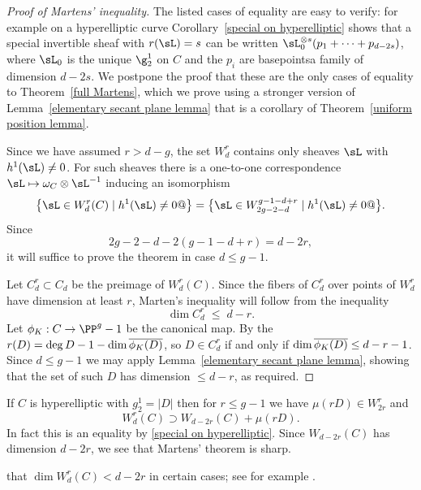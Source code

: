 \begin{proof}[Proof of Martens' inequality] 
 The listed cases of equality are easy to verify: for example on a hyperelliptic curve Corollary~\ref{special on hyperelliptic} shows that a special invertible sheaf with  $r(\sL) = s$ can be written $\sL_0^{\otimes s}(p_1+\cdots + p_{d-2s})$, where
$\sL_0$ is the unique $\g^1_2$ on $C$ and the $p_i$ are basepoints\emdash a family of dimension $d-2s$.
We postpone the proof that these are the only cases of equality to Theorem~\ref{full Martens}, which we prove
using a stronger version of Lemma~\ref{elementary secant plane lemma} that is a corollary of Theorem~\ref{uniform position lemma}. 

Since we have assumed $r>d-g$, the set $W^r_d$ contains only  sheaves
 $\sL$ with $h^1(\sL)\neq 0$. For such sheaves there is a one-to-one 
correspondence $\sL \mapsto \omega_C\otimes \sL^{-1}$ inducing an isomorphism
$$
\bigl\{\sL \in W^r_d(C) \mid h^1(\sL) \neq 0 @\bigr\}= \bigl\{\sL \in W^{g-1-d+r}_{2g-2-d} \mid h^1(\sL) \neq 0 @\bigl\}
.
$$
Since
$$
2g-2-d - 2(g-1-d+r) = d-2r,
$$
it will suffice to prove the theorem in case $d \leq g-1$.

\def\overlow#1{\overline{\vbox to 6.8pt{}\smash{#1}}}

Let $C^r_d\subset C_d$ be the preimage of $W^r_d(C)$. Since the fibers of $C^r_d$ over points of
$W^r_d$ have dimension at least $r$, Marten's inequality will follow from the inequality
$$
\dim C^r_d \; \leq \; d-r.
$$
\meshing
Let $\phi_K: C\to \PP^g-1$ be the canonical map. By the 
%
%
$r(D) = \deg D -1 -\dim\overlow{\phi_K(D)}$, 
so $D\in C^r_d$ if and only if
$\dim \overlow{\phi_K(D)}\leq d-r-1$. Since $d\leq g-1$ we may apply  Lemma~\ref{elementary secant plane lemma}, showing that the set of such $D$ has dimension $\leq d-r$, as required.
\end{proof}


If $C$ is hyperelliptic with $g^1_2 = |D|$ then for $r\leq g-1$ we have $\mu(rD) \in W^r_{2r}$ and
$$
W^r_d(C) \supset W_{d-2r}(C) + \mu(rD).
$$
In fact this is an equality by
\ref{special on hyperelliptic}. 
Since $W_{d-2r}(C)$ has dimension $d-2r$, we see that Martens' theorem is sharp. 

%
that $\dim W^r_d(C) < d-2r$ in certain cases; 
see for example \cite{Mumford-Prym1,Keem,Coppens}.

